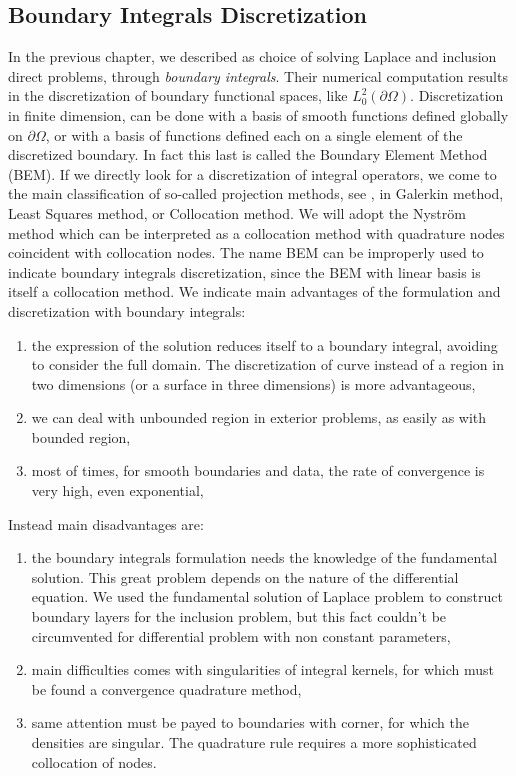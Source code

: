 \documentclass[10pt, a4paper, twoside, openright]{book}
\theoremstyle{definition}
\theoremstyle{plain}
\theoremstyle{plain}
\theoremstyle{plain}
\theoremstyle{plain}
\theoremstyle{plain}
\theoremstyle{plain}
\theoremstyle{plain}
\theoremstyle{plain}
\begin{document}
\subsection{Boundary Integrals Discretization}
In the previous chapter, we described as choice of solving Laplace and inclusion direct problems, through \emph{boundary integrals}. Their numerical computation results in the discretization of boundary functional spaces, like $L^2_0(\partial \Omega)$. 
Discretization in finite dimension, can be done with a basis of smooth functions defined globally on $\partial \Omega$, or with a basis of functions defined each on a single element of the discretized boundary. In fact this last is called the Boundary Element Method (BEM). 
If we directly look for a discretization of integral operators, we come to the main classification of so-called projection methods, see \cite{kirsch:book}, in Galerkin method, Least Squares method, or Collocation method. We will adopt the Nystr\"{o}m method which can be interpreted as a collocation method with quadrature nodes coincident with collocation nodes. The name BEM can be improperly used to indicate boundary integrals discretization, since the BEM with linear basis is itself a collocation method.
We indicate main advantages of the formulation and discretization with boundary integrals:
\begin{enumerate}
 \item the expression of the solution reduces itself to a boundary integral, avoiding to consider the full domain. The discretization of curve instead of a region in two dimensions (or a surface in three dimensions) is more advantageous,
 \item we can deal with unbounded region in exterior problems, as easily as with bounded region,
 \item most of times, for smooth boundaries and data, the rate of convergence is very high, even exponential,
\end{enumerate}
Instead main disadvantages are:
\begin{enumerate}
 \item the boundary integrals formulation needs the knowledge of the fundamental solution. This great problem depends on the nature of the differential equation. We used the fundamental solution of Laplace problem to construct boundary layers for the inclusion problem, but this fact couldn't be circumvented for differential problem with non constant parameters,
 \item main difficulties comes with singularities of integral kernels, for which must be found a convergence quadrature method,
 \item same attention must be payed to boundaries with corner, for which the densities are singular. The quadrature rule requires a more sophisticated collocation of nodes.
\end{enumerate}
\end{document}
